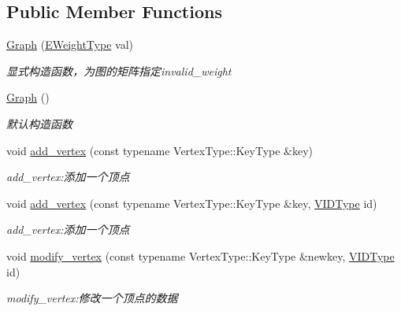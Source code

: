 \subsection*{Public Member Functions}
\begin{DoxyCompactItemize}
\item 
\hyperlink{struct_introduction_to_algorithm_1_1_graph_algorithm_1_1_graph_a1effb22f7cc51898e54bbb3a5f549c95}{Graph} (\hyperlink{struct_introduction_to_algorithm_1_1_graph_algorithm_1_1_graph_a77f6d3ef31203e0d6ebd2ed87928978a}{E\+Weight\+Type} val)
\begin{DoxyCompactList}\small\item\em 显式构造函数，为图的矩阵指定{\ttfamily invalid\+\_\+weight} \end{DoxyCompactList}\item 
\hyperlink{struct_introduction_to_algorithm_1_1_graph_algorithm_1_1_graph_a554fe807fb375fe4e56e5b0a0ac21477}{Graph} ()
\begin{DoxyCompactList}\small\item\em 默认构造函数 \end{DoxyCompactList}\item 
void \hyperlink{struct_introduction_to_algorithm_1_1_graph_algorithm_1_1_graph_a36d53ae51c00fe9bdfea74c01cf92102}{add\+\_\+vertex} (const typename Vertex\+Type\+::\+Key\+Type \&key)
\begin{DoxyCompactList}\small\item\em add\+\_\+vertex\+:添加一个顶点 \end{DoxyCompactList}\item 
void \hyperlink{struct_introduction_to_algorithm_1_1_graph_algorithm_1_1_graph_a34da6cd63b4ff8cf4498ef10c8f643b0}{add\+\_\+vertex} (const typename Vertex\+Type\+::\+Key\+Type \&key, \hyperlink{struct_introduction_to_algorithm_1_1_graph_algorithm_1_1_graph_a507632614d13e91d29acbf8acb0b0f0f}{V\+I\+D\+Type} id)
\begin{DoxyCompactList}\small\item\em add\+\_\+vertex\+:添加一个顶点 \end{DoxyCompactList}\item 
void \hyperlink{struct_introduction_to_algorithm_1_1_graph_algorithm_1_1_graph_ae36e2ef188da844f75a673516a6c7225}{modify\+\_\+vertex} (const typename Vertex\+Type\+::\+Key\+Type \&newkey, \hyperlink{struct_introduction_to_algorithm_1_1_graph_algorithm_1_1_graph_a507632614d13e91d29acbf8acb0b0f0f}{V\+I\+D\+Type} id)
\begin{DoxyCompactList}\small\item\em modify\+\_\+vertex\+:修改一个顶点的数据 \end{DoxyCompactList}\item 

\end{DoxyCompactItemize}
